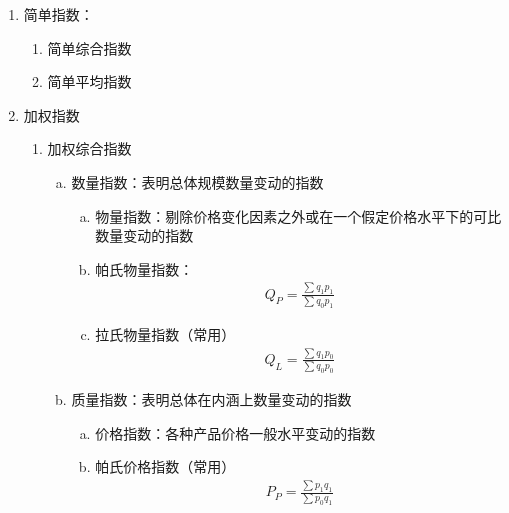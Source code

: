\documentclass[12pt]{book}
\begin{document}
\begin{enumerate}[1.]
    \item 简单指数：
          \begin{enumerate}[(1)]
              \item 简单综合指数
              \item 简单平均指数
          \end{enumerate}
    \item 加权指数
          \begin{enumerate}[(1)]
              \item 加权综合指数
                    \begin{enumerate}[a.]
                        \item 数量指数：表明总体规模数量变动的指数
                              \begin{enumerate}[(a)]
                                  \item 物量指数：剔除价格变化因素之外或在一个假定价格水平下的可比数量变动的指数
                                  \item 帕氏物量指数：
                                        \begin{gather*}
                                            Q_{P} = \frac{\sum{q_{1}p_{1}}}{\sum{q_{0}p_{1}}}
                                        \end{gather*}
                                  \item 拉氏物量指数（常用）
                                        \begin{gather*}
                                            Q_{L} = \frac{\sum{q_{1}p_{0}}}{\sum{q_{0}p_{0}}}
                                        \end{gather*}
                              \end{enumerate}
                        \item 质量指数：表明总体在内涵上数量变动的指数
                              \begin{enumerate}[(a)]
                                  \item 价格指数：各种产品价格一般水平变动的指数
                                  \item 帕氏价格指数（常用）
                                        \begin{gather*}
                                            P_{P} = \frac{\sum{p_{1}q_{1}}}{\sum{p_{0}q_{1}}}
                                        \end{gather*}

\end{enumerate}
\end{enumerate}
\end{enumerate}
\end{enumerate}
\end{document}
